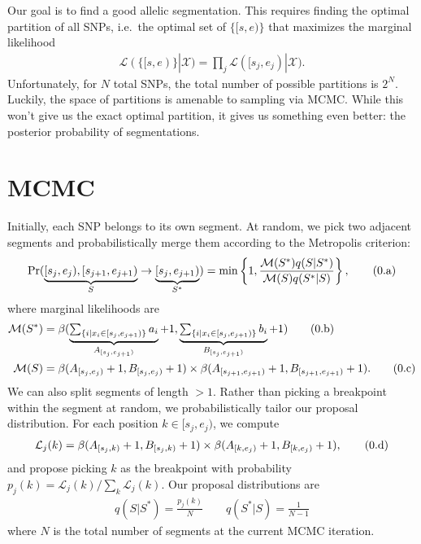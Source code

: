 \documentclass[10pt,letter]{article}
\numberwithin{equation}{section}
\newcommand{\rt}{\right}
\newcommand{\lt}{\left}
\newcommand{\btag}[1]{\addtocounter{equation}{1}\label{#1}\tag{\arabic{section}.\alph{equation}}}
\newcommand{\textop}[1]{\operatorname{#1}}
\begin{document}
Our goal is to find a good allelic segmentation. This requires finding the optimal partition of all SNPs, i.e.\ the optimal set of $\{[s,e)\}$ that maximizes the marginal likelihood
\begin{align*}
\mathcal{L}(\{[s,e)\}|\mathcal{X})=\prod_j \mathcal{L}([s_j,e_j)|\mathcal{X}).
\end{align*}
Unfortunately, for $N$ total SNPs, the total number of possible partitions is $2^N$. Luckily, the space of partitions is amenable to sampling via MCMC. While this won't give us the exact optimal partition, it gives us something even better: the posterior probability of segmentations.

\section{MCMC}

Initially, each SNP belongs to its own segment. At random, we pick two adjacent segments and probabilistically merge them according to the Metropolis criterion:
\begin{align*}
\textop{Pr}(\underbrace{[s_j,e_j),[s_{j+1},e_{j+1})}_{S}\to \underbrace{[s_j,e_{j+1})}_{S^\ast}) = \min\lt\{1,\frac{\mathcal{M}(S^\ast)q(S|S^\ast)}{\mathcal{M}(S)q(S^\ast|S)}\rt\},\btag{metro}
\end{align*}
where marginal likelihoods are
\begin{align*}
\mathcal{M}(S^\ast) &= \beta(\underbrace{\textstyle\sum_{\{i|x_i\in [s_j, e_{j+1})\}}a_i}_{A_{[s_j,e_{j+1})}}+1,\underbrace{\textstyle\sum_{\{i|x_i\in [s_j, e_{j+1})\}}b_i}_{B_{[s_j,e_{j+1})}}+1)\btag{psum_1}\\
\mathcal{M}(S) &= \beta(A_{[s_j,e_j)}+1,B_{[s_j,e_j)}+1)\times \beta(A_{[s_{j+1},e_{j+1})}+1,B_{[s_{j+1},e_{j+1})}+1).\btag{psum_2}
\end{align*}
We can also split segments of length $>1$. Rather than picking a breakpoint within the segment at random, we probabilistically tailor our proposal distribution. For each position $k\in [s_j,e_j)$, we compute
\begin{align*}
\mathcal{L}_j(k) = \beta(A_{[s_j,k)}+1,B_{[s_j,k)}+1)\times\beta(A_{[k,e_j)}+1,B_{[k,e_j)}+1),\btag{psum_3}
\end{align*}
and propose picking $k$ as the breakpoint with probability $p_j(k)=\mathcal{L}_j(k)/\sum_k \mathcal{L}_j(k)$. Our proposal distributions are
\begin{align*}
q(S|S^\ast) = \frac{p_j(k)}{N} \qquad q(S^\ast|S) = \frac{1}{N-1}
\end{align*}
where $N$ is the total number of segments at the current MCMC iteration.
\end{document}
